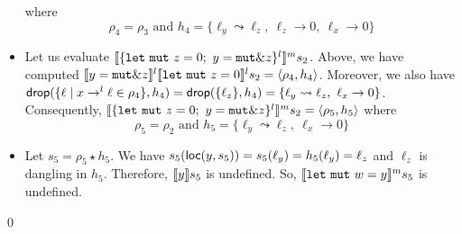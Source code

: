 \begin{example}
\begin{itemize}
    where
    \[\rho_4=\rho_3 \text{ and }
    h_4=\{\ell_y\leadsto\ell_z,\ \ell_z\to 0,\ \ell_x\to 0\}\]
    \item Let us evaluate
    $\denl[\{\mathtt{let\ mut}\ z = 0;\ y = \mathtt{mut}\borrow z\}^l]{m}{s_2}$.
    Above, we have computed $\denl[y = \mathtt{mut}\borrow z]{l}{
    \denl[\mathtt{let\ mut}\ z = 0]{l}{s_2}} = \langle\rho_4,h_4\rangle$.
    Moreover, we also have
    $\drop(\{\ell\mid x\to^l\ell\in\rho_4\},h_4) = \drop(\{\ell_z\},h_4) =
    \{\ell_y\leadsto\ell_z,\ \ell_x\to 0\}$. Consequently,
    $\denl[\{\mathtt{let\ mut}\ z = 0;\ y = \mathtt{mut}\borrow z\}^l]{m}{s_2} =
    \langle \rho_5,h_5\rangle$ where
    \[\rho_5 = \rho_2 \text{ and }
    h_5 = \{\ell_y\leadsto\ell_z,\ \ell_x\to 0\}\]
    \item Let $s_5 = \rho_5 \star h_5$.
    We have $s_5(\loc(y,s_5)) = s_5(\ell_y) = h_5(\ell_y) = \ell_z$
    and $\ell_z$ is dangling in $h_5$. Therefore, $\den[y]{s_5}$
    is undefined. So,
    $\denl[\mathtt{let\ mut}\ w = y]{m}{s_5}$ is undefined.
  \end{itemize}
  \qed
\end{example}

